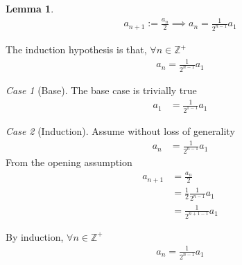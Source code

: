 \documentclass{amsart}
\numberwithin{equation}{section}
\let\oldendproof\endproof
\renewenvironment{proof}[1][\proofname]{%
  \setcounter{case}{0}
  \setcounter{step}{0}
  \oldproof[#1]%
}{\oldendproof}
\theoremstyle{plain}
\newtheorem{lemma}[theorem]{Lemma}
\theoremstyle{definition}
\theoremstyle{remark}
\newtheorem{case}{Case}
\begin{document}
\begin{lemma}\label{Lemma:IntermediateValueTheorem}
  \begin{align}
    a_{n+1} := \frac{a_n}{2} \implies a_n = \frac{1}{2^{n-1}} a_1
  \end{align}
\end{lemma}
\begin{proof}
  The induction hypothesis is that, $\forall n\in\mathbb{Z}^+$
  \begin{align}
    a_n = \frac{1}{2^{n-1}} a_1
  \end{align}
  \begin{case}[Base]
    The base case is trivially true
    \begin{align}
      a_1 &= \frac{1}{2^{1-1}} a_1
    \end{align}
  \end{case}
  \begin{case}[Induction]
    Assume without loss of generality
    \begin{align}
      a_n &= \frac{1}{2^{n-1}} a_1
    \end{align}
    From the opening assumption
    \begin{align}
      a_{n+1} &= \frac{a_n}{2}\\
      &=\frac{1}{2} \frac{1}{2^{n-1}} a_1\\
      &= \frac{1}{2^{n+1-1}} a_1
    \end{align}
  \end{case}
  By induction, $\forall n \in \mathbb{Z}^+$
  \begin{align}
    a_n = \frac{1}{2^{n-1}} a_1
  \end{align}
\end{proof}
\end{document}

